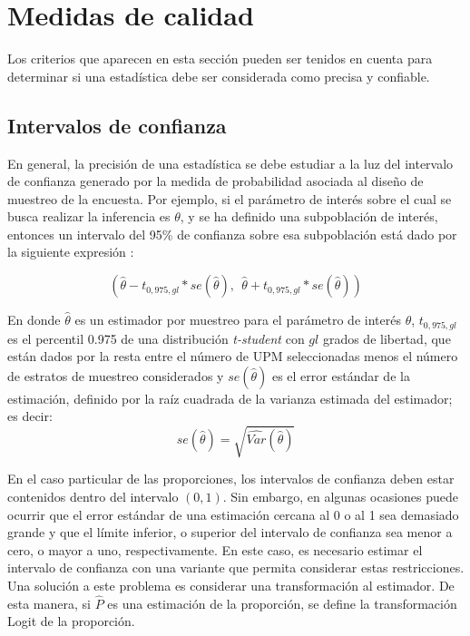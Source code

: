 \documentclass[
  12pt,
]{book}
\begin{document}
\hypertarget{medidas-de-calidad}{%
\section{Medidas de calidad}\label{medidas-de-calidad}}

Los criterios que aparecen en esta sección pueden ser tenidos en cuenta para determinar si una estadística debe ser considerada como precisa y confiable.

\hypertarget{intervalos-de-confianza}{%
\subsection{Intervalos de confianza}\label{intervalos-de-confianza}}

En general, la precisión de una estadística se debe estudiar a la luz del intervalo de confianza generado por la medida de probabilidad asociada al diseño de muestreo de la encuesta. Por ejemplo, si el parámetro de interés sobre el cual se busca realizar la inferencia es \(\theta\), y se ha definido una subpoblación de interés, entonces un intervalo del 95\% de confianza sobre esa subpoblación está dado por la siguiente expresión \citep{Heeringa_West_Berglund_2010}:

\[
(\hat\theta - t_{0,975, gl} * se(\hat\theta), \ \ \hat\theta + t_{0,975, gl} * se(\hat\theta))
\]

En donde \(\hat\theta\) es un estimador por muestreo para el parámetro de interés \(\theta\), \(t_{0,975, gl}\) es el percentil 0.975 de una distribución \emph{t-student} con \(gl\) grados de libertad, que están dados por la resta entre el número de UPM seleccionadas menos el número de estratos de muestreo considerados y \(se(\hat\theta)\) es el error estándar de la estimación, definido por la raíz cuadrada de la varianza estimada del estimador; es decir:
\[
se(\hat\theta) = \sqrt{\widehat{Var}(\hat\theta)}
\]

En el caso particular de las proporciones, los intervalos de confianza deben estar contenidos dentro del intervalo \((0, 1)\). Sin embargo, en algunas ocasiones puede ocurrir que el error estándar de una estimación cercana al 0 o al 1 sea demasiado grande y que el límite inferior, o superior del intervalo de confianza sea menor a cero, o mayor a uno, respectivamente. En este caso, es necesario estimar el intervalo de confianza con una variante que permita considerar estas restricciones. Una solución a este problema es considerar una transformación al estimador. De esta manera, si \(\hat{P}\) es una estimación de la proporción, se define la transformación Logit de la proporción.
\end{document}
